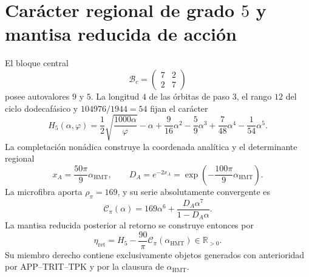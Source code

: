 \section{Carácter regional de grado \texorpdfstring{\(5\)}{5} y mantisa reducida de acción}
\label{sec:l9s102:eta-ret}

El bloque central
\begin{equation}
 \mathcal B_c=\begin{pmatrix}7&2\\2&7\end{pmatrix}
 \label{eq:l9s102:bc-accion}
\end{equation}
posee autovalores \(9\) y \(5\). La longitud \(4\) de las órbitas de paso
\(3\), el rango \(12\) del ciclo dodecafásico y
\(104976/1944=54\) fijan el carácter
\begin{equation}
 \boxed{
 H_5(\alpha,\varphi)
 =\frac12\sqrt{\frac{1000\alpha}{\varphi}}-\alpha
 +\frac9{16}\alpha^2-\frac59\alpha^3
 +\frac7{48}\alpha^4-\frac1{54}\alpha^5.}
 \label{eq:l9s102:h5}
\end{equation}
La completación nonádica construye la coordenada analítica y el determinante
regional
\begin{equation}
 x_A=\frac{50\pi}{9}\alpha_{\mathrm{HMT}},
 \qquad
 D_A=e^{-2x_A}
 =\exp\!\left(-\frac{100\pi}{9}\alpha_{\mathrm{HMT}}\right).
 \label{eq:l9s102:xa-da}
\end{equation}
La microfibra aporta \(\rho_\pi=169\), y su serie absolutamente
convergente es
\begin{equation}
 \mathscr C_\pi(\alpha)
 =169\alpha^6+\frac{D_A\alpha^7}{1-D_A\alpha}.
 \label{eq:l9s102:cpi}
\end{equation}
La mantisa reducida posterior al retorno se construye entonces por
\begin{equation}
 \boxed{
 \eta_{\mathrm{ret}}
 =H_5-\frac{90}{\pi}\mathscr C_\pi(\alpha_{\mathrm{HMT}})
 \in\mathbb R_{>0}.}
 \label{eq:l9s102:eta-ret}
\end{equation}
Su miembro derecho contiene exclusivamente objetos generados con anterioridad
por APP--TRIT--TPK y por la clausura de \(\alpha_{\mathrm{HMT}}\).


